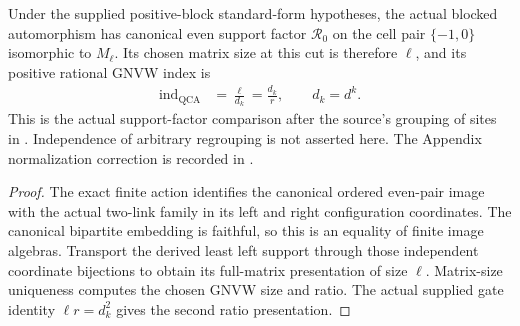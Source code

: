 \begin{lemma}
    \label{lem:mpu_actual_blocked_gnvw_index}
    \leanok
    Under the supplied positive-block standard-form hypotheses, the
    actual blocked automorphism has canonical even support factor
    $\mathcal R_0$ on the cell pair $\{-1,0\}$ isomorphic to $M_\ell$.
    Its chosen matrix size at this cut is therefore $\ell$, and its
    positive rational GNVW index is
    \begin{align}
        \operatorname{ind}_{\mathrm{QCA}}
         & =\frac{\ell}{d_k}=\frac{d_k}{r},\qquad d_k=d^k.
        \label{eq:mpu_qca_blocked_index_ratio}
    \end{align}
    This is the actual support-factor comparison after the source's
    grouping of sites in \cite[Appendix, lines~2313--2334]{Cirac2017MPU}.
    Independence of arbitrary regrouping is not asserted here. The
    Appendix normalization correction is recorded in
    \cite{gap:mpu_qca_index_normalization}.
\end{lemma}
\begin{proof}\leanok
    The exact finite action identifies the canonical ordered even-pair
    image with the actual two-link family in its left and right
    configuration coordinates. The canonical bipartite embedding is
    faithful, so this is an equality of finite image algebras. Transport
    the derived least left support through those independent coordinate
    bijections to obtain its full-matrix presentation of size $\ell$.
    Matrix-size uniqueness computes the chosen GNVW size and ratio.
    The actual supplied gate identity $\ell r=d_k^2$ gives the second
    ratio presentation.
\end{proof}


